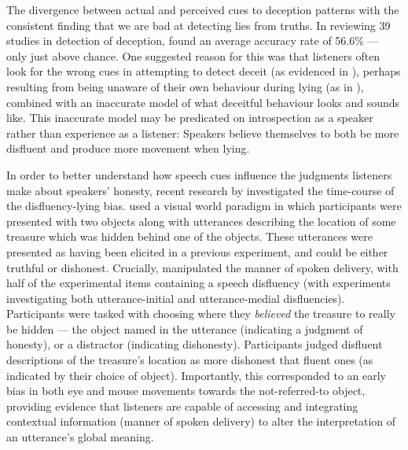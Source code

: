 \documentclass[a4paper,man,natbib]{apa6}
\begin{document}
The divergence between actual and perceived cues to deception patterns with the consistent finding that we are bad at detecting lies from truths.
In reviewing 39 studies in detection of deception, \citet{Vrij2000} found an average accuracy rate of 56.6\% --- only just above chance. 
One suggested reason for this was that listeners often look for the wrong cues in attempting to detect deceit (as evidenced in \citealt{DePaulo1982}), perhaps resulting from being unaware of their own behaviour during lying (as in \citealt{Vrij1996}), combined with an inaccurate model of what deceitful behaviour looks and sounds like. 
This inaccurate model may be predicated on introspection as a speaker rather than experience as a listener: Speakers believe themselves to both be more disfluent \citep{Zuckerman1981a} and produce more movement \citep{Vrij1996} when lying. 

In order to better understand how speech cues influence the judgments listeners make about speakers' honesty, recent research by \citet{Loy2017} investigated the time-course of the disfluency-lying bias.
\citet{Loy2017} used a visual world paradigm in which participants were presented with two objects along with utterances describing the location of some treasure which was hidden behind one of the objects. 
These utterances were presented as having been elicited in a previous experiment, and could be either truthful or dishonest.
Crucially, \citet{Loy2017} manipulated the manner of spoken delivery, with half of the experimental items containing a speech disfluency (with experiments investigating both utterance-initial and utterance-medial disfluencies).
Participants were tasked with choosing where they \textit{believed} the treasure to really be hidden --- the object named in the utterance (indicating a judgment of honesty), or a distractor (indicating dishonesty).
Participants judged disfluent descriptions of the treasure's location as more dishonest that fluent ones (as indicated by their choice of object).
Importantly, this corresponded to an early bias in both eye and mouse movements towards the not-referred-to object, providing evidence that listeners are capable of accessing and integrating contextual information (manner of spoken delivery) to alter the interpretation of an utterance's global meaning.
\end{document}
